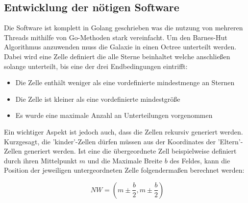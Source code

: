\documentclass[a4paper, 10pt]{article}
\begin{document}
\begin{multicols*}{2}
\subsection{Entwicklung der nötigen Software}
Die Software ist komplett in Golang geschrieben was die nutzung von mehreren
Threads mithilfe von Go-Methoden stark vereinfacht.  Um den Barnes-Hut
Algorithmus anzuwenden muss die Galaxie in einen Octree unterteilt werden.
Dabei wird eine Zelle definiert die alle Sterne beinhaltet welche anschließen
solange unterteilt, bis eine der drei Endbedingungen eintrifft: \begin{itemize}
	\item Die Zelle enthält weniger als eine vordefinierte mindestmenge an
		Sternen \item Die Zelle ist kleiner als eine vordefinierte
mindestgröße \item Es wurde eine maximale Anzahl an Unterteilungen vorgenommen
\end{itemize} Ein wichtiger Aspekt ist jedoch auch, dass die Zellen rekursiv
generiert werden. Kurzgesagt, die 'kinder'-Zellen dürfen müssen aus der
Koordinates der 'Eltern'-Zellen generiert werden. Ist eine die übergeordnete
Zell beispielweise definiert durch ihren Mittelpunkt \( m \)  und die Maximale
Breite \( b \) des Feldes, kann die Position der jeweiligen untergeordneten Zelle
folgendermaßen berechnet werden:


\begin{equation}
	NW = \left( m \pm \frac{b}{2}, m \pm \frac{b}{2} \right)
\end{equation}


\bigskip

\begin{center}
\end{center}


\end{multicols*}
\end{document}
